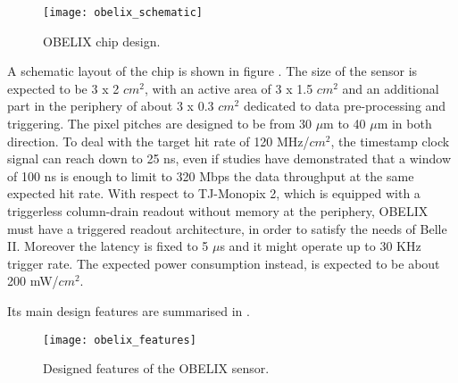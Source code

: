 \begin{figure}[h!]
\centering
\texttt{[image: obelix\_schematic]}
\caption{OBELIX chip design.}
\label{fig:obelix_scheme}
\end{figure}

A schematic  layout of the chip is shown in figure . The size of the sensor is expected to be 3 x 2 $cm^{2}$, with an active area of 3 x 1.5 $cm^{2}$ and an additional part in the periphery of about 3 x 0.3 $cm^{2}$ dedicated to data pre-processing and triggering. The pixel pitches are designed to be from 30 $\mu$m to 40 $\mu$m in both direction. 
To deal with the target hit rate of 120 MHz/$cm^{2}$, the timestamp clock signal can reach down to 25 ns, even if studies have demonstrated that a window of 100 ns is enough to limit to 320 Mbps the data throughput at the same expected hit rate.
With respect to TJ-Monopix 2, which is equipped with a triggerless column-drain readout without memory at the periphery, OBELIX must have a triggered readout architecture, in order to satisfy the needs of Belle II. Moreover the latency is fixed to 5 $\mu$s and it might operate up to 30 KHz trigger rate.
The expected power consumption instead, is expected to be about 200 mW/$cm^{2}$. 

Its main design features are summarised in .


\begin{figure}[h!]
\centering
\texttt{[image: obelix\_features]}
\caption{Designed features of the OBELIX sensor.}
\label{fig:obelix_features}
\end{figure}





\begin{comment}
\section{Mechanical structure}


\end{comment}








